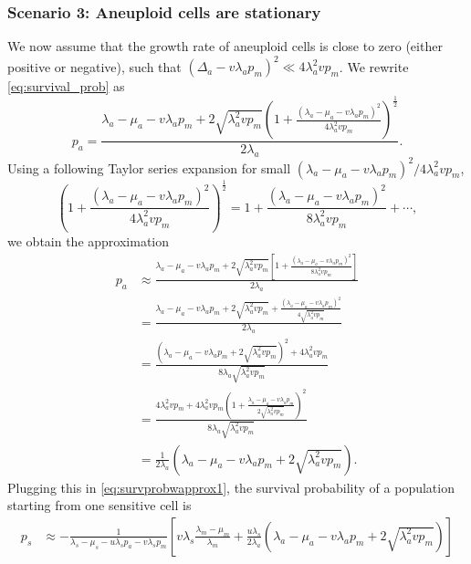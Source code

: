 \documentclass[12pt]{extarticle}
\begin{document}
\begin{appendices}
\subsubsection*{Scenario 3: Aneuploid cells are stationary} 
We now assume that the growth rate of aneuploid cells is close to zero (either positive or negative), such that  $\left(\Delta_a-v\lambda_ap_m\right)^2 \ll 4\lambda_a^2vp_m$.
We rewrite \cref{eq:survival_prob} as
\begin{equation}
p_a = \frac{\lambda_a-\mu_a-v\lambda_ap_m+2\sqrt{\lambda_a^2 vp_m}\left(1+\frac{\left(\lambda_a-\mu_a-v\lambda_ap_m\right)^2}{4\lambda_a^2vp_m}\right)^{\frac12}}{2\lambda_a} .
\end{equation}
Using a following Taylor series expansion for small $\left(\lambda_a-\mu_a-v\lambda_ap_m\right)^2 / 4\lambda_a^2vp_m$,
\begin{equation*}
\left(1+\frac{\left(\lambda_a-\mu_a-v\lambda_ap_m\right)^2}{4\lambda_a^2vp_m}\right)^{\frac{1}{2}}=1+\frac{\left(\lambda_a-\mu_a-v\lambda_ap_m\right)^2}{8\lambda_a^2vp_m}+\cdots,
\end{equation*}
we obtain the approximation
\begin{equation}
\begin{aligned}
p_a&\approx\frac{\lambda_a-\mu_a-v\lambda_ap_m+2\sqrt{\lambda_a^2 vp_m}\left[1+\frac{\left(\lambda_a-\mu_a-v\lambda_ap_m\right)^2}{8\lambda_a^2vp_m}\right]}{2\lambda_a}\\
&=\frac{\lambda_a-\mu_a-v\lambda_ap_m+2\sqrt{\lambda_a^2 vp_m}+\frac{\left(\lambda_a-\mu_a-v\lambda_ap_m\right)^2}{4\sqrt{\lambda_a^2vp_m}}}{2\lambda_a}\\
&=\frac{\left(\lambda_a-\mu_a-v\lambda_ap_m+2\sqrt{\lambda_a^2vp_m}\right)^2+4\lambda_a^2vp_m}{8\lambda_a\sqrt{\lambda_a^2vp_m}}\\
&=\frac{4\lambda_a^2vp_m+4\lambda_a^2vp_m\left(1+\frac{\lambda_a-\mu_a-v\lambda_ap_m}{2\sqrt{\lambda_a^2vp_m}}\right)^2}{8\lambda_a\sqrt{\lambda_a^2vp_m}}\\
&=\frac{1}{2\lambda_a}\left(\lambda_a-\mu_a-v\lambda_ap_m+2\sqrt{\lambda_a^2vp_m}\right).
\end{aligned}
\end{equation}
Plugging this in \cref{eq:survprobwapprox1}, the survival probability of a population starting from one sensitive cell is
\begin{equation}\label{eq:scenario3}
\begin{aligned}
p_s&\approx-\frac{1}{\lambda_s-\mu_s-u\lambda_sp_a-v\lambda_sp_m}\left[v\lambda_s\frac{\lambda_m-\mu_m}{\lambda_m}+\frac{u\lambda_s}{2\lambda_a}\left(\lambda_a-\mu_a-v\lambda_ap_m+2\sqrt{\lambda_a^2vp_m}\right)\right]\\

\end{aligned}
\end{equation}
\end{appendices}
\end{document}
